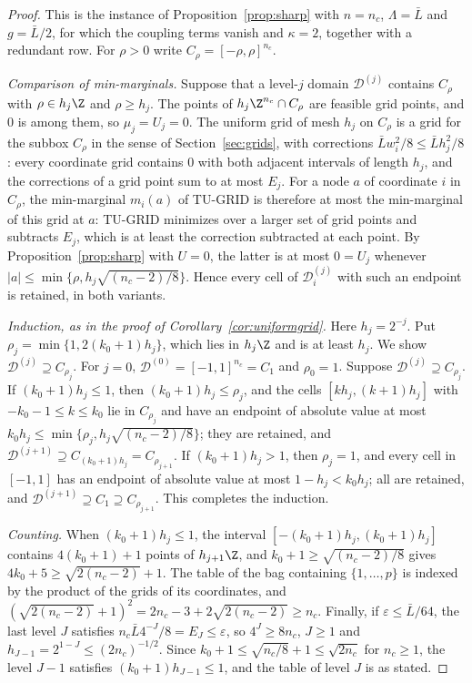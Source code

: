 \begin{proof}
This is the instance of Proposition~\ref{prop:sharp} with $n=n_c$,
$\Lambda=\bar L$ and $g=\bar L/2$, for which the coupling terms vanish and
$\kappa=2$, together with a redundant row. For $\rho>0$ write
$C_\rho=[-\rho,\rho]^{n_c}$.

\emph{Comparison of min-marginals.} Suppose that a level-$j$ domain
$\mathcal D^{(j)}$ contains $C_\rho$ with $\rho\in h_j\Z$ and $\rho\ge h_j$. The
points of $h_j\Z^{n_c}\cap C_\rho$ are feasible grid points, and $0$ is among
them, so $\mu_j=U_j=0$. The uniform grid of mesh $h_j$ on $C_\rho$ is a
grid for the subbox $C_\rho$ in the sense of Section~\ref{sec:grids}, with
corrections $\bar Lw_i^2/8\le\bar Lh_j^2/8$: every coordinate grid contains
$0$ with both adjacent intervals of length $h_j$, and the corrections of a
grid point sum to at most $E_j$. For a node $a$ of coordinate $i$ in
$C_\rho$, the min-marginal $m_i(a)$ of TU-GRID is therefore at most the
min-marginal of this grid at $a$: TU-GRID minimizes over a larger set of
grid points and subtracts $E_j$, which is at least the correction subtracted
at each point.
By Proposition~\ref{prop:sharp} with $U=0$, the latter is at most $0=U_j$
whenever $\lvert a\rvert\le\min\{\rho,h_j\sqrt{(n_c-2)/8}\}$. Hence every cell
of $\mathcal D^{(j)}_i$ with such an endpoint is retained, in both variants.

\emph{Induction, as in the proof of Corollary~\ref{cor:uniformgrid}.} Here
$h_j=2^{-j}$. Put $\rho_j=\min\{1,2(k_0+1)h_j\}$, which lies in $h_j\Z$ and is at
least $h_j$. We show $\mathcal D^{(j)}\supseteq C_{\rho_j}$. For $j=0$,
$\mathcal D^{(0)}=[-1,1]^{n_c}=C_1$ and $\rho_0=1$. Suppose
$\mathcal D^{(j)}\supseteq C_{\rho_j}$. If $(k_0+1)h_j\le1$, then
$(k_0+1)h_j\le\rho_j$, and the cells $[kh_j,(k+1)h_j]$ with $-k_0-1\le k\le k_0$ lie in
$C_{\rho_j}$ and have an endpoint of absolute value at most
$k_0 h_j\le\min\{\rho_j,h_j\sqrt{(n_c-2)/8}\}$; they are retained, and
$\mathcal D^{(j+1)}\supseteq C_{(k_0+1)h_j}=C_{\rho_{j+1}}$. If $(k_0+1)h_j>1$, then
$\rho_j=1$, and every cell in $[-1,1]$ has an endpoint of absolute value at
most $1-h_j<k_0 h_j$; all are retained, and
$\mathcal D^{(j+1)}\supseteq C_1\supseteq C_{\rho_{j+1}}$. This completes the
induction.

\emph{Counting.} When $(k_0+1)h_j\le1$, the interval $[-(k_0+1)h_j,(k_0+1)h_j]$
contains $4(k_0+1)+1$ points of $h_{j+1}\Z$, and $k_0+1\ge\sqrt{(n_c-2)/8}$ gives
$4k_0+5\ge\sqrt{2(n_c-2)}+1$. The table of the bag containing $\{1,\dots,p\}$ is
indexed by the product of the grids of its coordinates, and
$(\sqrt{2(n_c-2)}+1)^2=2n_c-3+2\sqrt{2(n_c-2)}\ge n_c$. Finally, if
$\varepsilon\le\bar L/64$, the last level $J$ satisfies
$n_c\bar L4^{-J}/8=E_J\le\varepsilon$, so $4^J\ge8n_c$, $J\ge1$ and
$h_{J-1}=2^{1-J}\le(2n_c)^{-1/2}$. Since
$k_0+1\le\sqrt{n_c/8}+1\le\sqrt{2n_c}$ for $n_c\ge1$, the level $J-1$ satisfies
$(k_0+1)h_{J-1}\le1$, and the table of level $J$ is as stated.
\end{proof}

